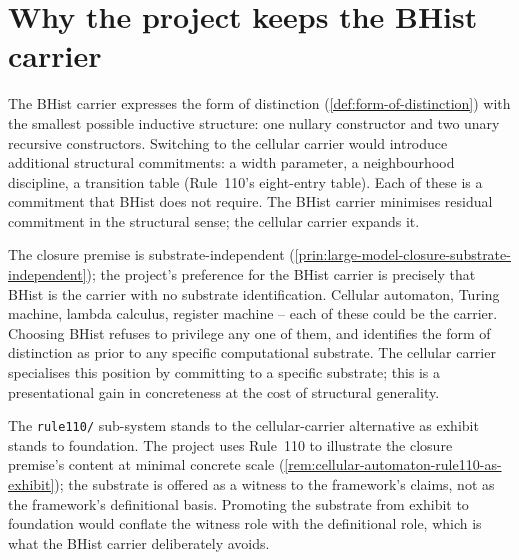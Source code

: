 \section{Why the project keeps the BHist carrier}
\label{sec:cellular-carrier-why-bhist}

\begin{principle}
\label{prin:cellular-carrier-minimum-residual-commitment}
The BHist carrier expresses the form of distinction (\autoref{def:form-of-distinction}) with the smallest possible inductive structure: one nullary constructor and two unary recursive constructors. Switching to the cellular carrier would introduce additional structural commitments: a width parameter, a neighbourhood discipline, a transition table (Rule~110's eight-entry table). Each of these is a commitment that BHist does not require. The BHist carrier minimises residual commitment in the structural sense; the cellular carrier expands it.
\end{principle}

\begin{principle}
\label{prin:cellular-carrier-substrate-independence-is-feature}
The closure premise is substrate-independent (\autoref{prin:large-model-closure-substrate-independent}); the project's preference for the BHist carrier is precisely that BHist is the carrier with no substrate identification. Cellular automaton, Turing machine, lambda calculus, register machine -- each of these could be the carrier. Choosing BHist refuses to privilege any one of them, and identifies the form of distinction as prior to any specific computational substrate. The cellular carrier specialises this position by committing to a specific substrate; this is a presentational gain in concreteness at the cost of structural generality.
\end{principle}

\begin{remark}
\label{rem:cellular-carrier-as-exhibit}
The \texttt{rule110/} sub-system stands to the cellular-carrier alternative as exhibit stands to foundation. The project uses Rule~110 to illustrate the closure premise's content at minimal concrete scale (\autoref{rem:cellular-automaton-rule110-as-exhibit}); the substrate is offered as a witness to the framework's claims, not as the framework's definitional basis. Promoting the substrate from exhibit to foundation would conflate the witness role with the definitional role, which is what the BHist carrier deliberately avoids.
\end{remark}

